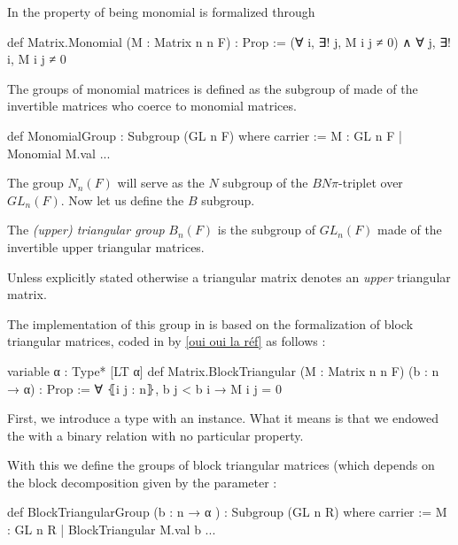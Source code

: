 \begin{implementation}
    In \Lean the property of being monomial is formalized through
    \begin{leancode}
def Matrix.Monomial (M : Matrix n n F) : Prop := 
    (∀ i, ∃! j, M i j ≠ 0) ∧ ∀ j, ∃! i, M i j ≠ 0
    \end{leancode}
    The groups of monomial matrices is defined as the subgroup of  made of the invertible matrices who coerce to monomial matrices.
    \begin{leancode}
def MonomialGroup : Subgroup (GL n F) where
  carrier := {M : GL n F | Monomial M.val}
    ...
\end{leancode}
\end{implementation}

The group $N_n\left( F \right)$ will serve as the $N$ subgroup of the $BN\pi$-triplet over $GL_n(F)$. Now let us define the $B$ subgroup.

\begin{definition}
    The \emph{(upper) triangular group} $B_n\left( F \right)$ is the subgroup of $GL_n\left( F \right)$ made of the invertible upper triangular matrices.
\end{definition}

\begin{remarque}
Unless explicitly stated otherwise a triangular matrix denotes an \emph{upper} triangular matrix.
\end{remarque}

The implementation of this group in \Lean is based on the formalization of block triangular matrices, coded in by \ref{oui oui la réf} as follows :
\begin{leancode}
variable {α : Type*} [LT α]
def Matrix.BlockTriangular (M : Matrix n n F) (b : n → α) : Prop :=
 ∀ ⦃i j : n⦄, b j < b i → M i j = 0
\end{leancode}

\begin{commentary}
First, we introduce a type  with an \lean{[LT α]} instance.  What it means is that we endowed the  with a binary relation  with no particular property.
\end{commentary} 

With this we define the groups of block triangular matrices (which depends on the block decomposition given by the parameter  :

\begin{leancode}
def BlockTriangularGroup (b : n → α ) : Subgroup (GL n R) where
  carrier :=  {M : GL n R | BlockTriangular M.val b }
  ...
\end{leancode}

